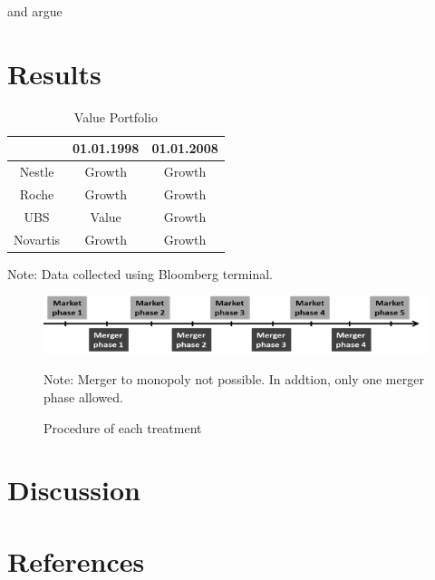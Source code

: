 \documentclass{article}
\begin{document}
\cite{Milgrom1982} and \cite{Gormsen2020} argue \blindtext
\newpage

\section{Results}


\begin{table} [!h] \centering 
	\begin{threeparttable}
		\caption{Value Portfolio}
     	\begin{tabular}{ccc}
        	\toprule
				    	& 01.01.1998 & 01.01.2008\\ 
			\midrule
			Nestle  	& Growth 	& Growth \\
			Roche 		& Growth 	& Growth \\ 
			UBS 		& Value 	& Growth \\
			Novartis 	& Growth 	& Growth \\ 
			\bottomrule
		\end{tabular}
		\footnotesize Note: Data collected using Bloomberg terminal.
	\end{threeparttable}
\end{table}

\blindtext

\begin{figure} [!h]
	\caption{Procedure of each treatment}
 	\begin{centering}
		\includegraphics[width=0.8\linewidth]{phases} \\
	\end{centering}
	\footnotesize Note: Merger to monopoly not possible. In addtion, only one merger phase allowed. 
\end{figure}

\newpage

\section{Discussion}
\blindtext
\newpage







\section{References}
\begingroup
\renewcommand{\section}[2]{}
\nocite{*}
\printbibliography
\endgroup

\newpage
\end{document}
